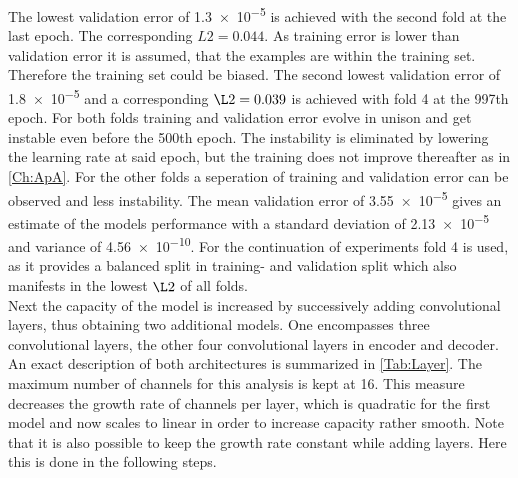 The lowest validation error of \num{1.3e-5} is achieved with the second fold at the last epoch. The corresponding \(L2 = 0.044\). As training error is lower than validation error it is assumed, that the  examples are within the training set. Therefore the training set could be biased. The second lowest validation error of \num{1.8e-5} and a corresponding \(\L2=0.039\) is achieved with fold 4 at the 997th epoch. For both folds training and validation error evolve in unison and get instable even before the 500th epoch. The instability is eliminated by lowering the learning rate at said epoch, but the training does not improve thereafter as in \cref{Ch:ApA}. For the other folds a seperation of training and validation error can be observed and less instability. The mean validation error of \num{3.55e-5} gives an estimate of the models performance with a standard deviation of \num{2.13e-5} and variance of \num{4.56e-10}. For the continuation of experiments fold 4 is used, as it provides a balanced split in training- and validation split which also manifests in the lowest \(\L2\) of all folds.\\
Next the capacity of the model is increased by successively adding convolutional layers, thus obtaining two additional models. One encompasses three convolutional layers, the other four convolutional layers in encoder and decoder. An exact description of both architectures is summarized in \cref{Tab:Layer}. The maximum number of channels for this analysis is kept at 16. This measure decreases the growth rate of channels per layer, which is quadratic for the first model and now scales to linear in order to increase capacity rather smooth. Note that it is also possible to keep the growth rate constant while adding layers. Here this is done in the following steps.\\
